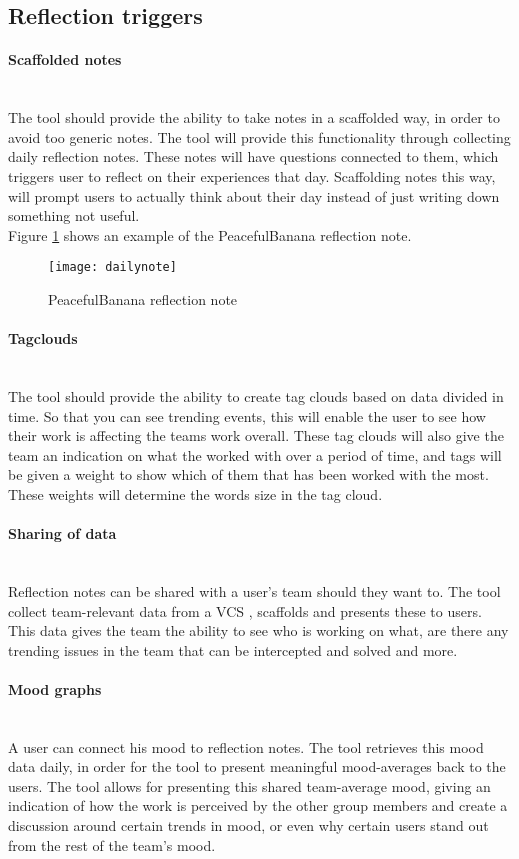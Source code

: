\subsection{Reflection triggers}
\paragraph{Scaffolded notes}\mbox{}\\
The tool should provide the ability to take notes in a scaffolded way, in order to avoid too generic notes. The tool will provide this functionality through collecting daily reflection notes. These notes will have questions connected to them, which triggers user to reflect on their experiences that day. Scaffolding notes this way, will prompt users to actually think about their day instead of just writing down something not useful. \\
Figure \ref{dailynote} shows an example of the PeacefulBanana reflection note. 
\begin{figure}[H]
    \centering
        \texttt{[image: dailynote]}
    \caption{PeacefulBanana reflection note}
    \label{dailynote}
\end{figure}
\paragraph{Tagclouds}\mbox{}\\
The tool should provide the ability to create tag clouds based on data divided in time. So that you can see trending events, this will enable the user to see how their work is affecting the teams work overall. These tag clouds will also give the team an indication on what the worked with over a period of time, and tags will be given a weight to show which of them that has been worked with the most. These weights will determine the words size in the tag cloud. 
\paragraph{Sharing of data}\mbox{}\\
Reflection notes can be shared with a user's team should they want to. The tool collect team-relevant data from a VCS , scaffolds and presents these to users. This data gives the team the ability to see who is working on what, are there any trending issues in the team that can be intercepted and solved and more.  
\paragraph{Mood graphs}\mbox{}\\
A user can connect his mood to reflection notes. The tool retrieves this mood data daily, in order for the tool to present meaningful mood-averages back to the users. 
The tool allows for presenting this shared team-average mood, giving an indication of how the work is perceived by the other group members and create a discussion around certain trends in mood, or even why certain users stand out from the rest of the team's mood. 

